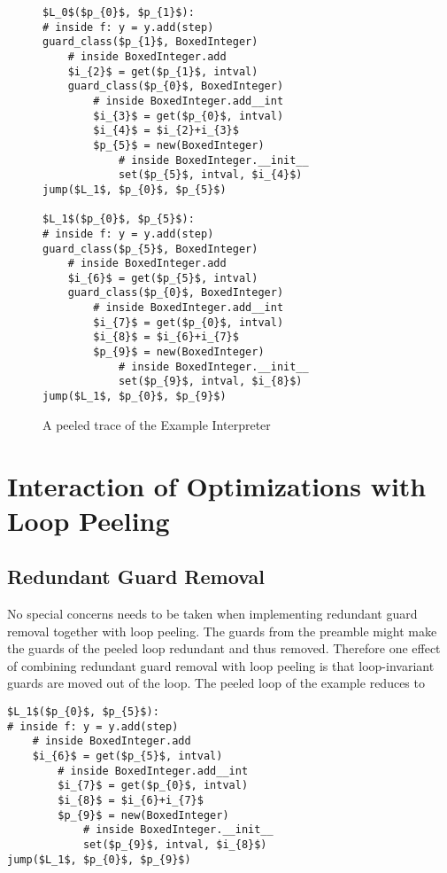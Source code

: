 \documentclass[preprint]{sigplanconf}
\begin{document}
\begin{figure}
\begin{lstlisting}[mathescape,numbers = right,basicstyle=\setstretch{1.05}\ttfamily\scriptsize]
$L_0$($p_{0}$, $p_{1}$):
# inside f: y = y.add(step)
guard_class($p_{1}$, BoxedInteger)
    # inside BoxedInteger.add
    $i_{2}$ = get($p_{1}$, intval)
    guard_class($p_{0}$, BoxedInteger)
        # inside BoxedInteger.add__int
        $i_{3}$ = get($p_{0}$, intval)
        $i_{4}$ = $i_{2}+i_{3}$
        $p_{5}$ = new(BoxedInteger)
            # inside BoxedInteger.__init__
            set($p_{5}$, intval, $i_{4}$)
jump($L_1$, $p_{0}$, $p_{5}$)

$L_1$($p_{0}$, $p_{5}$):
# inside f: y = y.add(step)
guard_class($p_{5}$, BoxedInteger)
    # inside BoxedInteger.add
    $i_{6}$ = get($p_{5}$, intval)
    guard_class($p_{0}$, BoxedInteger)
        # inside BoxedInteger.add__int
        $i_{7}$ = get($p_{0}$, intval)
        $i_{8}$ = $i_{6}+i_{7}$
        $p_{9}$ = new(BoxedInteger)
            # inside BoxedInteger.__init__
            set($p_{9}$, intval, $i_{8}$)
jump($L_1$, $p_{0}$, $p_{9}$)
\end{lstlisting}
\caption{A peeled trace of the Example Interpreter}
\label{fig:peeled-trace}
\end{figure}

\section{Interaction of Optimizations with Loop Peeling}

\subsection{Redundant Guard Removal}

No special concerns needs to be taken when implementing redundant
guard removal together with loop peeling. The guards from
the preamble might make the guards of the peeled loop
redundant and thus removed. Therefore one effect of combining redundant
guard removal with loop peeling is that loop-invariant guards are moved out of the
loop. The peeled loop of the example reduces to

\begin{lstlisting}[mathescape,numbers = right,basicstyle=\setstretch{1.05}\ttfamily\scriptsize]
$L_1$($p_{0}$, $p_{5}$):
# inside f: y = y.add(step)
    # inside BoxedInteger.add
    $i_{6}$ = get($p_{5}$, intval)
        # inside BoxedInteger.add__int
        $i_{7}$ = get($p_{0}$, intval)
        $i_{8}$ = $i_{6}+i_{7}$
        $p_{9}$ = new(BoxedInteger)
            # inside BoxedInteger.__init__
            set($p_{9}$, intval, $i_{8}$)
jump($L_1$, $p_{0}$, $p_{9}$)
\end{lstlisting}
\end{document}
